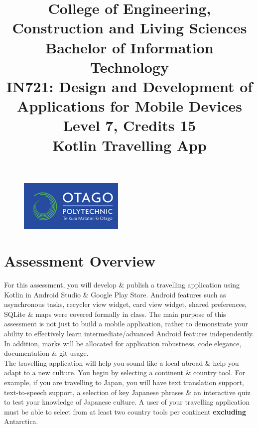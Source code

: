 \documentclass{article}
\author{}
\begin{document}
\begin{figure}
	\centering
	\includegraphics[width=50mm]{./img/logo.png}
\end{figure}

\title{College of Engineering, Construction and Living Sciences\\Bachelor of Information Technology\\IN721: Design and Development of Applications for Mobile Devices\\Level 7, Credits 15\\\textbf{Kotlin Travelling App}}
\date{}
\maketitle

\section*{Assessment Overview}
For this assessment, you will develop \& publish a travelling application using Kotlin in Android Studio \& Google Play Store. Android features such as asynchronous tasks, recycler view widget, card view widget, shared preferences, SQLite \& maps were covered formally in class. The main purpose of this assessment is not just to build a mobile application, rather to demonstrate your ability to effectively learn intermediate/advanced Android features independently. In addition, marks will be allocated for application robustness, code elegance, documentation \& git usage. \\ 

The travelling application will help you sound like a local abroad \& help you adapt to a new culture. You begin by selecting a continent \& country tool. For example, if you are travelling to Japan, you will have text translation support, text-to-speech support, a selection of key Japanese phrases \& an interactive quiz to test your knowledge of Japanese culture. A user of your travelling application must be able to select from at least two country tools per continent \textbf{excluding} Antarctica.
\end{document}
